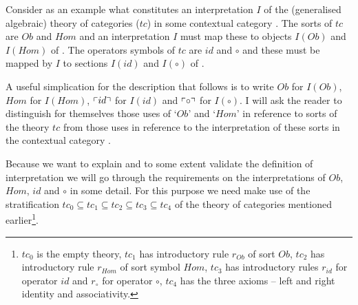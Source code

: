 \newcommand{\associativitylhstype}{\isT{{Hom(z_1,z_4)}}}
\newcommand{\associativitylhstypemapped}{\crossx{\Big(\associativitypremisemapped\Big)}{\tuple{z_1,z_4}^*Hom}{Ob^4}}
\newcommand{\associativitylhstermtyping}{\ofT{(f \circ g) \circ h}{Hom(z_1,z_4)}}
\newcommand{\associativityrhstermtyping}{\ofT{f \circ (g \circ h)}{Hom(z_1,z_4)}}		

\note
Consider as an example
what constitutes an interpretation $I$ of the (generalised algebraic) theory of categories ($tc$) in some 
 contextual category \catc.
The sorts of $tc$ are $Ob$ and $Hom$ 
and an interpretation $I$ must map these to objects $I(Ob)$ and  $I(Hom)$ of \catc.
The operators symbols of
$tc$ are  $id$ and $\circ$ and these must be mapped by $I$ to sections $I(id)$ and $I(\circ)$ of \catc.

A useful simplication for the description that follows is to write $Ob$ for $I(Ob)$, $Hom$ for $I(Hom)$, $\left\ulcorner id\right\urcorner$ for $I(id)$ and   $\left\ulcorner\circ\right\urcorner$ for $I(\circ)$.   I will ask the reader  to distinguish for themselves 
those uses of `$Ob$' and `$Hom$' in reference to sorts of the theory $tc$ from those uses in reference to the interpretation of these sorts in the contextual category \catc. 

Because we want to explain and to some extent validate the definition of interpretation we will go through the
requirements on the interpretations of $Ob$, $Hom$, $id$ and $\circ$ in some detail.  For this purpose we
need make use of the stratification 
$tc_0 \subseteq tc_1 \subseteq tc_2 \subseteq tc_3 \subseteq tc_4$
of the theory of categories mentioned earlier\footnote{$tc_0$ is the empty theory, $tc_1$ has introductory rule 
$r_{Ob}$ of sort $Ob$, $tc_2$ has introductory rule $r_{Hom}$ of sort symbol $Hom$, $tc_3$ has introductory rules
$r_{id}$ for operator $id$ and  $r_\circ$ for operator $\circ$, $tc_4$ has the three axioms -- left and right identity and associativity.}.


